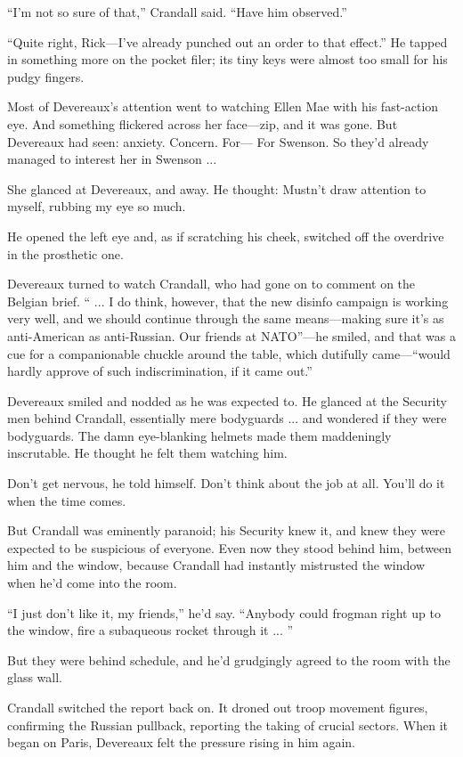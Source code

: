 ``I'm not so sure of that,'' Crandall said. ``Have him observed.''

``Quite right, Rick—I've already punched out an order to that effect.'' He tapped in something more on the pocket filer; its tiny keys were almost too small for his pudgy fingers.

Most of Devereaux's attention went to watching Ellen Mae with his fast-action eye. And something flickered across her face—zip, and it was gone. But Devereaux had seen: anxiety. Concern. For— For Swenson. So they'd already managed to interest her in Swenson ...

She glanced at Devereaux, and away. He thought: Mustn't draw attention to myself, rubbing my eye so much.

He opened the left eye and, as if scratching his cheek, switched off the overdrive in the prosthetic one.

Devereaux turned to watch Crandall, who had gone on to comment on the Belgian brief. `` ... I do think, however, that the new disinfo campaign is working very well, and we should continue through the same means—making sure it's as anti-American as anti-Russian. Our friends at NATO''—he smiled, and that was a cue for a companionable chuckle around the table, which dutifully came—``would hardly approve of such indiscrimination, if it came out.''

Devereaux smiled and nodded as he was expected to. He glanced at the Security men behind Crandall, essentially mere bodyguards ... and wondered if they were bodyguards. The damn eye-blanking helmets made them maddeningly inscrutable. He thought he felt them watching him.

Don't get nervous, he told himself. Don't think about the job at all. You'll do it when the time comes.

But Crandall was eminently paranoid; his Security knew it, and knew they were expected to be suspicious of everyone. Even now they stood behind him, between him and the window, because Crandall had instantly mistrusted the window when he'd come into the room.

``I just don't like it, my friends,'' he'd say. ``Anybody could frogman right up to the window, fire a subaqueous rocket through it ... ''

But they were behind schedule, and he'd grudgingly agreed to the room with the glass wall.

Crandall switched the report back on. It droned out troop movement figures, confirming the Russian pullback, reporting the taking of crucial sectors. When it began on Paris, Devereaux felt the pressure rising in him again.

